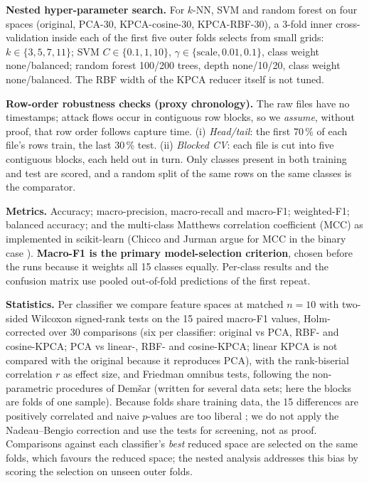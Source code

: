 \documentclass[runningheads]{llncs}
\begin{document}
\textbf{Nested hyper-parameter search.} For $k$-NN, SVM and random forest on four spaces (original, PCA-30, KPCA-cosine-30, KPCA-RBF-30), a 3-fold inner cross-validation inside each of the first five outer folds selects from small grids: $k\in\{3,5,7,11\}$; SVM $C\in\{0.1,1,10\}$, $\gamma\in\{\text{scale},0.01,0.1\}$, class weight none/balanced; random forest 100/200 trees, depth none/10/20, class weight none/balanced. The RBF width of the KPCA reducer itself is not tuned.

\textbf{Row-order robustness checks (proxy chronology).} The raw files have no timestamps; attack flows occur in contiguous row blocks, so we \emph{assume}, without proof, that row order follows capture time. (i) \emph{Head/tail}: the first 70\,\% of each file's rows train, the last 30\,\% test. (ii) \emph{Blocked CV}: each file is cut into five contiguous blocks, each held out in turn. Only classes present in both training and test are scored, and a random split of the same rows on the same classes is the comparator.

\textbf{Metrics.} Accuracy; macro-precision, macro-recall and macro-F1; weighted-F1; balanced accuracy; and the multi-class Matthews correlation coefficient (MCC) as implemented in scikit-learn (Chicco and Jurman argue for MCC in the binary case \cite{chicco2020}). \textbf{Macro-F1 is the primary model-selection criterion}, chosen before the runs because it weights all 15 classes equally. Per-class results and the confusion matrix use pooled out-of-fold predictions of the first repeat.

\textbf{Statistics.} Per classifier we compare feature spaces at matched $n=10$ with two-sided Wilcoxon signed-rank tests on the 15 paired macro-F1 values, Holm-corrected over 30 comparisons (six per classifier: original vs PCA, RBF- and cosine-KPCA; PCA vs linear-, RBF- and cosine-KPCA; linear KPCA is not compared with the original because it reproduces PCA), with the rank-biserial correlation $r$ as effect size, and Friedman omnibus tests, following the non-parametric procedures of Dem\v{s}ar \cite{demsar2006} (written for several data sets; here the blocks are folds of one sample). Because folds share training data, the 15 differences are positively correlated and naive $p$-values are too liberal \cite{nadeau2003}; we do not apply the Nadeau--Bengio correction and use the tests for screening, not as proof. Comparisons against each classifier's \emph{best} reduced space are selected on the same folds, which favours the reduced space; the nested analysis addresses this bias by scoring the selection on unseen outer folds.
\end{document}

